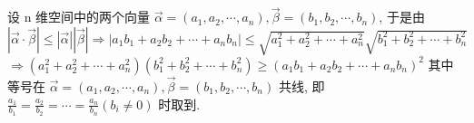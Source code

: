 设 n 维空间中的两个向量 $\vec{\alpha}=\left(a_{1}, a_{2}, \cdots, a_{n}\right), \vec{\beta}=\left(b_{1}, b_{2}, \cdots, b_{n}\right)$,
于是由 $|\vec{\alpha} \cdot \vec{\beta}| \leq|\vec{\alpha}||\vec{\beta}| \Rightarrow\left|a_{1} b_{1}+a_{2} b_{2}+\cdots+a_{n} b_{n}\right| \leq \sqrt{a_{1}^{2}+a_{2}^{2}+\cdots+a_{n}^{2}} \sqrt{b_{1}^{2}+b_{2}^{2}+\cdots+b_{n}^{2}}$
$\Rightarrow\left(a_{1}^{2}+a_{2}^{2}+\cdots+a_{n}^{2}\right)\left(b_{1}^{2}+b_{2}^{2}+\cdots+b_{n}^{2}\right) \geq\left(a_{1} b_{1}+a_{2} b_{2}+\cdots+a_{n} b_{n}\right)^{2}$
其中等号在 $\vec{\alpha}=\left(a_{1}, a_{2}, \cdots, a_{n}\right), \vec{\beta}=\left(b_{1}, b_{2}, \cdots, b_{n}\right)$ 共线, 即 $\frac{a_{1}}{b_{1}}=\frac{a_{2}}{b_{2}}=\cdots=\frac{a_{n}}{b_{n}}\left(b_{i} \neq 0\right)$ 时取到.



